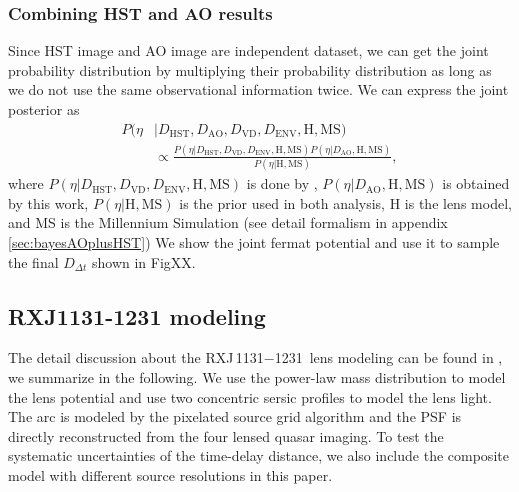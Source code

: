 \documentclass[useAMS,usenatbib]{mnras}
\newcommand\todo[1]{\textcolor{red}{#1}}
\newcommand\rxj{RXJ\,1131$-$1231}
\newcommand{\Ddt}{{D_{\Delta t}}}
\begin{document}
\subsubsection{Combining HST and AO results}
Since HST image and AO image are independent dataset, we can get the joint probability distribution by multiplying their probability distribution as long as we do not use the same observational information twice. We can express the joint posterior as
\begin{equation}
\label{final}
\begin{split}
P(\eta&|D_{\textrm{HST}},D_{\textrm{AO}},D_{\textrm{VD}}, D_{\textrm{ENV}},\textrm{H},\textrm{MS})\\
&\propto \frac{P(\eta|D_{\textrm{HST}},D_{\textrm{VD}}, D_{\textrm{ENV}},\textrm{H},\textrm{MS})P(\eta|D_{\textrm{AO}},\textrm{H},\textrm{MS})}{P(\eta|\textrm{H},\textrm{MS})},
\end{split}
\end{equation}
where $P(\eta|D_{\textrm{HST}},D_{\textrm{VD}},D_{\textrm{ENV}},\textrm{H},\textrm{MS})$ is done by \citep{WongEtal17}, $P(\eta|D_{\textrm{AO}},\textrm{H},\textrm{MS})$ is obtained by this work, $P(\eta|\textrm{H},\textrm{MS})$ is the prior used in both analysis, H is the lens model, and MS is the Millennium Simulation (see detail formalism in appendix \ref{sec:bayesAOplusHST})
We show the joint fermat potential and use it to sample the final $\Ddt$ shown in FigXX.



\subsection{RXJ1131-1231 modeling}
\label{subsec:RXJmodeling}
The detail discussion about the \rxj~lens modeling can be found in \citet{GChenEtal16}, we summarize in the following. We use the power-law mass distribution to model the lens potential and use two concentric sersic profiles to model the lens light. The arc is modeled by the pixelated source grid algorithm and the PSF is directly reconstructed from the four lensed quasar imaging.
To test the systematic uncertainties of the time-delay distance, we also include the composite model with different source resolutions in this paper.
\end{document}
